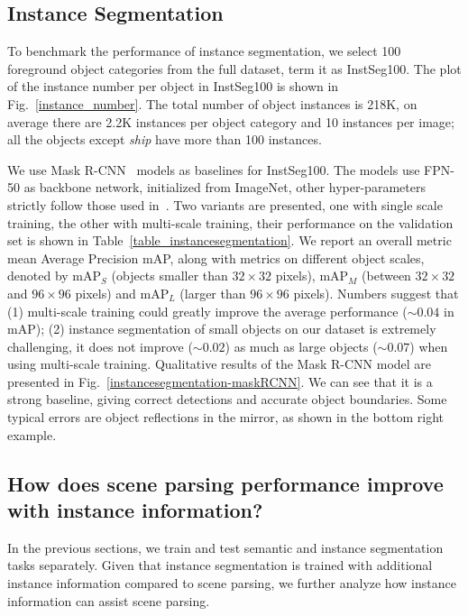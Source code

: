 \subsection{Instance Segmentation}
\label{instance_segm_sec}
To benchmark the performance of instance segmentation, we select 100 foreground object categories from the full dataset, term it as InstSeg100. The plot of the instance number per object in InstSeg100 is shown in Fig.~\ref{instance_number}. The total number of object instances is 218K, on average there are 2.2K instances per object category and 10 instances per image; all the objects except \textit{ship} have more than 100 instances.

We use Mask R-CNN~\cite{he2017mask} models as baselines for InstSeg100. The models use FPN-50 as backbone network, initialized from ImageNet, other hyper-parameters strictly follow those used in~\cite{he2017mask}. Two variants are presented, one with single scale training, the other with multi-scale training, their performance on the validation set is shown in Table~\ref{table_instancesegmentation}. We report an overall metric mean Average Precision mAP, along with metrics on different object scales, denoted by mAP$_{S}$ (objects smaller than $32\times32$ pixels), mAP$_{M}$ (between $32\times32$ and $96\times96$ pixels) and mAP$_{L}$ (larger than $96\times96$ pixels). Numbers suggest that (1) multi-scale training could greatly improve the average performance ($\sim0.04$ in mAP); (2) instance segmentation of small objects on our dataset is extremely challenging, it does not improve ($\sim0.02$) as much as large objects ($\sim0.07$) when using multi-scale training. Qualitative results of the Mask R-CNN model are presented in Fig.~\ref{instancesegmentation-maskRCNN}. We can see that it is a strong baseline, giving correct detections and accurate object boundaries. Some typical errors are object reflections in the mirror, as shown in the bottom right example.

\subsection{How does scene parsing performance improve with instance information?} In the previous sections, we train and test semantic and instance segmentation tasks separately. Given that instance segmentation is trained with additional instance information compared to scene parsing, we further analyze how instance information can assist scene parsing. 

